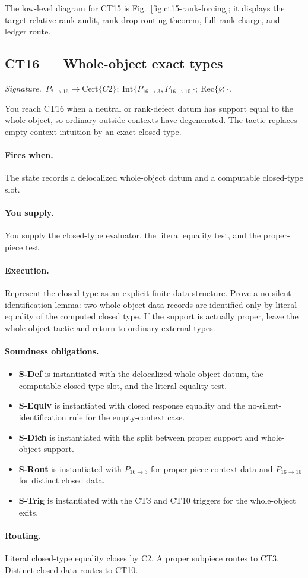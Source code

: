 \documentclass[
  11pt,
]{article}
\providecommand{\tightlist}{%
  \setlength{\itemsep}{0pt}\setlength{\parskip}{0pt}}
\theoremstyle{definition}
\newcommand{\ctsignature}[1]{\par\noindent\emph{Signature.}\ #1\par\medskip}
\newcommand{\ctcert}[1]{\mathrm{Cert}\{#1\}}
\newcommand{\ctint}[1]{\mathrm{Int}\{#1\}}
\newcommand{\ctrec}[1]{\mathrm{Rec}\{#1\}}
\newcommand{\ctnone}{\varnothing}
\newcommand{\ctpar}[1]{\paragraph{#1.}}
\begin{document}
The low-level diagram for CT15 is Fig.~\ref{fig:ct15-rank-forcing};
it displays the target-relative rank audit, rank-drop routing theorem,
full-rank charge, and ledger route.



\subsection{CT16 --- Whole-object exact types}\label{ct:16}\label{the-whole-object-piece-exact-types-under-context-degeneracy}
\ctsignature{\(P_{\ast\to16}\to \ctcert{C2};\ \ctint{P_{16\to3},P_{16\to10}};\ \ctrec{\ctnone}\).}

You reach CT16 when a neutral or rank-defect datum has support equal to
the whole object, so ordinary outside contexts have degenerated.  The
tactic replaces empty-context intuition by an exact closed type.

\ctpar{Fires when}
The state records a delocalized whole-object datum and a computable
closed-type slot.

\ctpar{You supply}
You supply the closed-type evaluator, the literal equality test, and the
proper-piece test.

\ctpar{Execution}
Represent the closed type as an explicit finite data structure. Prove a
no-silent-identification lemma: two whole-object data records are
identified only by literal equality of the computed closed type. If the
support is actually proper, leave the whole-object
tactic and return to ordinary external types.

\ctpar{Soundness obligations}
\begin{itemize}
\tightlist
\item \textbf{S-Def} is instantiated with the delocalized whole-object datum, the computable closed-type slot, and the literal equality test.
\item \textbf{S-Equiv} is instantiated with closed response equality and the no-silent-identification rule for the empty-context case.
\item \textbf{S-Dich} is instantiated with the split between proper support and whole-object support.
\item \textbf{S-Rout} is instantiated with \(P_{16\to3}\) for proper-piece context data and \(P_{16\to10}\) for distinct closed data.
\item \textbf{S-Trig} is instantiated with the CT3 and CT10 triggers for the whole-object exits.
\end{itemize}

\ctpar{Routing}
Literal closed-type equality closes by C2.  A proper subpiece routes to
CT3.  Distinct closed data routes to CT10.
\end{document}
